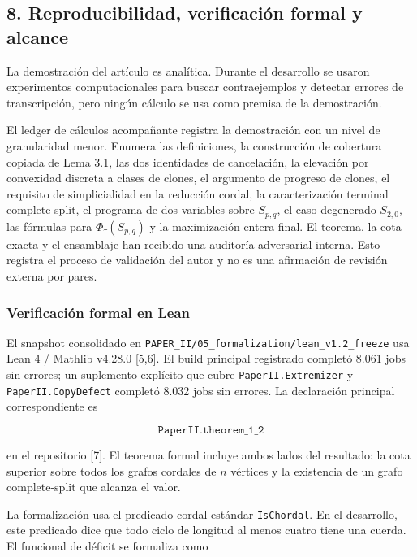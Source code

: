\documentclass[spanish,11pt,a4paper]{article}
\begin{document}
\subsection{8. Reproducibilidad, verificación formal y
alcance}\label{reproducibilidad-verificaciuxf3n-formal-y-alcance}

La demostración del artículo es analítica. Durante el desarrollo se
usaron experimentos computacionales para buscar contraejemplos y
detectar errores de transcripción, pero ningún cálculo se usa como
premisa de la demostración.

El ledger de cálculos acompañante registra la demostración con un nivel
de granularidad menor. Enumera las definiciones, la construcción de
cobertura copiada de Lema 3.1, las dos identidades de cancelación, la
elevación por convexidad discreta a clases de clones, el argumento de
progreso de clones, el requisito de simplicialidad en la reducción
cordal, la caracterización terminal complete-split, el programa de dos
variables sobre \(S_{p,q}\), el caso degenerado \(S_{2,0}\), las
fórmulas para \(\Phi_\tau(S_{p,q})\) y la maximización entera final. El
teorema, la cota exacta y el ensamblaje han recibido una auditoría
adversarial interna. Esto registra el proceso de validación del autor y
no es una afirmación de revisión externa por pares.

\subsubsection{Verificación formal en
Lean}\label{verificaciuxf3n-formal-en-lean}

El snapshot consolidado en
\nolinkurl{PAPER_II/05_formalization/lean_v1.2_freeze} usa Lean 4 /
Mathlib v4.28.0 {[}5,6{]}. El build principal registrado completó 8.061
jobs sin errores; un suplemento explícito que cubre
\nolinkurl{PaperII.Extremizer} y \nolinkurl{PaperII.CopyDefect} completó 8.032
jobs sin errores. La declaración principal correspondiente es

\[
\texttt{PaperII.theorem\_1\_2}
\]

en el repositorio {[}7{]}. El teorema formal incluye ambos lados del
resultado: la cota superior sobre todos los grafos cordales de \(n\)
vértices y la existencia de un grafo complete-split que alcanza el
valor.

La formalización usa el predicado cordal estándar \nolinkurl{IsChordal}. En
el desarrollo, este predicado dice que todo ciclo de longitud al menos
cuatro tiene una cuerda. El funcional de déficit se formaliza como
\end{document}

